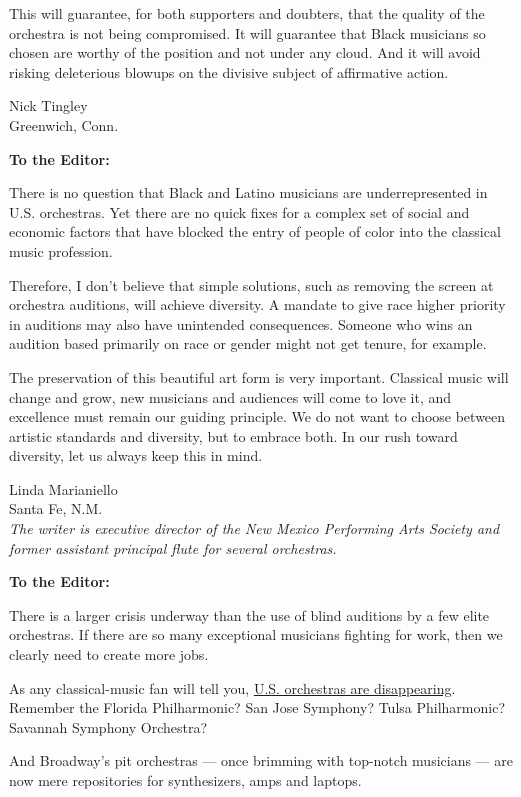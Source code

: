 This will guarantee, for both supporters and doubters, that the quality
of the orchestra is not being compromised. It will guarantee that Black
musicians so chosen are worthy of the position and not under any cloud.
And it will avoid risking deleterious blowups on the divisive subject of
affirmative action.

Nick Tingley\\
Greenwich, Conn.

\textbf{To the Editor:}

There is no question that Black and Latino musicians are
underrepresented in U.S. orchestras. Yet there are no quick fixes for a
complex set of social and economic factors that have blocked the entry
of people of color into the classical music profession.

Therefore, I don't believe that simple solutions, such as removing the
screen at orchestra auditions, will achieve diversity. A mandate to give
race higher priority in auditions may also have unintended consequences.
Someone who wins an audition based primarily on race or gender might not
get tenure, for example.

The preservation of this beautiful art form is very important. Classical
music will change and grow, new musicians and audiences will come to
love it, and excellence must remain our guiding principle. We do not
want to choose between artistic standards and diversity, but to embrace
both. In our rush toward diversity, let us always keep this in mind.

Linda Marianiello\\
Santa Fe, N.M.\\
\emph{The writer is executive director of the New Mexico Performing Arts
Society and former assistant principal flute for several orchestras.}

\textbf{To the Editor:}

There is a larger crisis underway than the use of blind auditions by a
few elite orchestras. If there are so many exceptional musicians
fighting for work, then we clearly need to create more jobs.

As any classical-music fan will tell you,
\href{https://www.nytimes.com/2003/05/14/arts/as-funds-disappear-so-do-orchestras.html}{U.S.
orchestras are disappearing}. Remember the Florida Philharmonic? San
Jose Symphony? Tulsa Philharmonic? Savannah Symphony Orchestra?

And Broadway's pit orchestras --- once brimming with top-notch musicians
--- are now mere repositories for synthesizers, amps and laptops.

